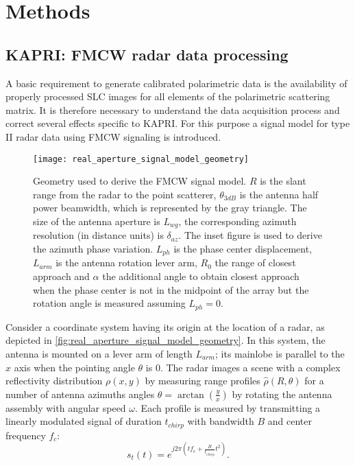 \section{Methods}\label{sec:methods}
\subsection{KAPRI: FMCW radar data processing}\label{sec:proc_SLC}
A basic requirement to generate calibrated polarimetric data is the availability of properly processed SLC images for all elements of the polarimetric scattering matrix. It is therefore necessary to understand the data acquisition process and correct several effects specific to KAPRI.  
For this purpose a signal model for type II\cite{Caduff2015} radar data using FMCW signaling\cite{Stove1992} is introduced.\\
\begin{figure}[h]
	\centering
	\texttt{[image: real\_aperture\_signal\_model\_geometry]}
	\caption{Geometry used to derive the FMCW signal model. $R$ is the slant range from the radar to the point scatterer, $\theta_{3dB}$ is the antenna half power beamwidth, which is represented by the gray triangle. The size of the antenna aperture is $L_{wg}$, the corresponding azimuth resolution (in distance units) is $\delta_{az}$. The inset figure is used to derive the azimuth phase variation. $L_{ph}$ is the phase center displacement, $L_{arm}$ is the antenna rotation lever arm, $R_{0}$ the range of closest approach and $\alpha$ the additional angle to obtain closest approach when the phase center is not in the midpoint of the array but the rotation angle is measured assuming $L_{ph}=0$.}
	\label{fig:real_aperture_signal_model_geometry}
\end{figure}
Consider a coordinate system having its origin at the location of a radar, as depicted in \autoref{fig:real_aperture_signal_model_geometry}. In this system, the antenna is mounted on a lever arm of length $L_{arm}$; its mainlobe is parallel to the $x$ axis when the pointing angle $\theta$ is 0. The radar images a scene with a complex reflectivity distribution $\rho\left(x,y\right)$ by measuring range profiles $\hat{\rho}\left(R, \theta\right)$ for a number of antenna azimuths angles $\theta = \operatorname{arctan}\left(\frac{y}{x}\right)$ by rotating the antenna assembly with angular speed $\omega$. Each profile is measured by transmitting a linearly modulated signal of duration $t_{chirp}$ with bandwidth $B$ and center frequency $f_c$:
\begin{equation}
	s_t\left(t\right) = e^{j 2 \pi \left( t f_{c} +  \frac{B}{t_{chirp}} t^2 \right)}.
\end{equation}
